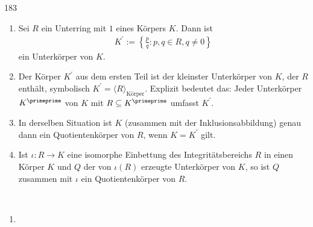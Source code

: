 \begin{algebraUE}{183}
\begin{enumerate}
  \item Sei $R$ ein Unterring mit $1$ eines Körpers $K$. Dann ist
  \begin{align*}
    K^{\prime} := \left\{\frac{p}{q}: p,q \in R, q \neq 0 \right\}
  \end{align*}
  ein Unterkörper von $K$.
  \item Der Körper $K^{\prime}$ aus dem ersten Teil ist der kleinster Unterkörper
  von $K$, der $R$ enthält, symbolisch $K^{\prime} = \langle R \rangle_{\text{Körper}}$.
  Explizit bedeutet das: Jeder Unterkörper $K^{\primeprime}$ von $K$ mit $R \subseteq K^{\primeprime}$
  umfasst $K^{\prime}$.
  \item In derselben Situation ist $K$ (zusammen mit der Inklusionsabbildung) genau
  dann ein Quotientenkörper von $R$, wenn $K = K^{\prime}$ gilt.
  \item Ist $\iota: R \rightarrow K$ eine isomorphe Einbettung des Integritätsbereichs $R$
  in einen Körper $K$ und $Q$ der von $\iota(R)$ erzeugte Unterkörper von $K$,
  so ist $Q$ zusammen mit $\iota$ ein Quotientenkörper von $R$.
\end{enumerate}
\end{algebraUE}
\begin{solution}
\leavevmode \\
\begin{enumerate}
  \item
\end{enumerate}

\end{solution}
